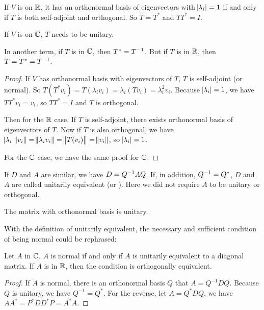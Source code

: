\begin{theorem}
    If $V$ is on $\mathbb{R}$, it has an orthonormal basis of eigenvectors with $\abs{\lambda_i} = 1$ if and only if $T$ is both self-adjoint and orthogonal. So $T = T^*$ and $TT^* = I$.
    
    If $V$ is on $\mathbb{C}$, $T$ needs to be unitary.
    
    In another term, if $T$ is in $\mathbb{C}$, then $T^* = {T}^{-1}$. But if $T$ is in $\mathbb{R}$, then $T = T^* = {T}^{-1}$.
\end{theorem}
\begin{proof}
    If $V$ has orthonormal basis with eigenvectors of $T$, $T$ is self-adjoint (or normal). So $T(T^* v_i) = T (\lambda_i v_i) = \lambda_i (T v_i) = \lambda_i^2 v_i$. Because $\abs{\lambda_i} = 1$, we have $TT^* v_i = v_i$, so $TT^* = I$ and $T$ is orthogonal.
    
    Then for the $\mathbb{R}$ case. If $T$ is self-adjoint, there exists orthonormal basis of eigenvectors of $T$. Now if $T$ is also orthogonal, we have $\abs{\lambda_i} \norm{v_i} = \norm{\lambda_i v_i} = \norm{T (v_i)} = \norm{v_i}$, so $\abs{\lambda_i} = 1$. 
    
    For the $\mathbb{C}$ case, we have the same proof for $\mathbb{C}$.
\end{proof}


\begin{definition}
    If $D$ and $A$ are similar, we have $D = {Q}^{-1} A Q$. If, in addition, ${Q}^{-1} = Q^*$, $D$ and $A$ are called unitarily equivalent (or ). Here we did not require $A$ to be unitary or orthogonal.
\end{definition}


\begin{theorem}
    The matrix with orthonormal basis is unitary.
\end{theorem}


With the definition of unitarily equivalent, the necessary and sufficient condition of being normal could be rephrased:
\begin{theorem}
    Let $A$ in $\mathbb{C}$. $A$ is normal if and only if $A$ is unitarily equivalent to a diagonal matrix. If $A$ is in $\mathbb{R}$, then the condition is orthogonally equivalent.
\end{theorem}
\begin{proof}
    If $A$ is normal, there is an orthonormal basis $Q$ that $A = Q^{-1} D Q$. Because $Q$ is unitary, we have $Q^{-1} = Q^*$. 
    For the reverse, let $A=Q^* D Q$, we have $AA^* = P^* D D^* P = A^* A$.
\end{proof}

